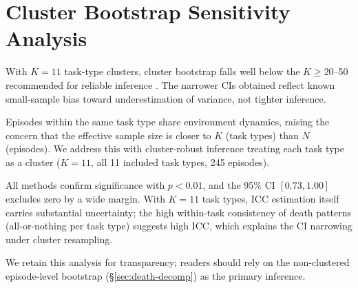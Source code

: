 \documentclass[11pt]{article}
\begin{document}
\section{Cluster Bootstrap Sensitivity Analysis}
\label{app:wild-cluster}

With $K{=}11$ task-type clusters, cluster bootstrap falls well below the $K{\geq}20$--50 recommended for reliable inference \citep{cameron-2008,webb-2023}. The narrower CIs obtained reflect known small-sample bias toward underestimation of variance, not tighter inference.

Episodes within the same task type share environment dynamics, raising the concern that the effective sample size is closer to $K$ (task types) than $N$ (episodes). We address this with cluster-robust inference treating each task type as a cluster ($K{=}11$, all 11 included task types, 245 episodes).

\begin{table}[h]
\centering
\small
{}%
\caption{Cluster-level tests of death-rate asymmetry ($K{=}11$ task clusters, 245 episodes). 10 of 11 clusters show internal DR $>$ deterministic DR; the sole exception (\texttt{find-non-living-thing}) has zero deaths under both strategies. Cohen's $d = 3.02$. The exact permutation $p = 0.002$ ($4/2{,}048$) reflects the near-unanimous directional consistency.}
\label{tab:wild-cluster}
\end{table}

\noindent All methods confirm significance with $p < 0.01$, and the 95\% CI $[0.73, 1.00]$ excludes zero by a wide margin. With $K{=}11$ task types, ICC estimation itself carries substantial uncertainty; the high within-task consistency of death patterns (all-or-nothing per task type) suggests high ICC, which explains the CI narrowing under cluster resampling.

We retain this analysis for transparency; readers should rely on the non-clustered episode-level bootstrap (\S\ref{sec:death-decomp}) as the primary inference.
\end{document}
